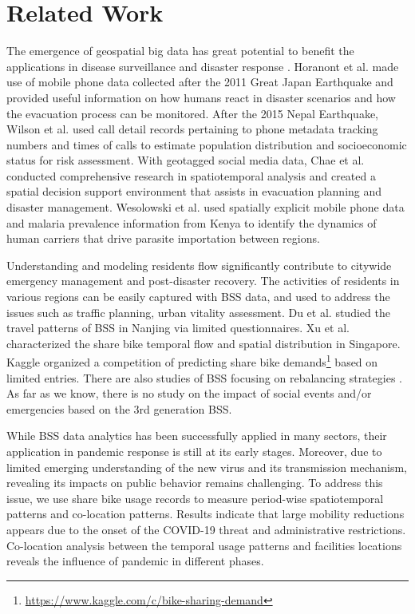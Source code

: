 \documentclass[preprints,ijgi,submit,moreauthors]{Definitions/mdpi}
\begin{document}
\section*{Related Work}
The emergence of geospatial big data has great potential to benefit the applications in disease surveillance and disaster response \cite{Yu2018Big, Goodchild2010Crowdsourcing, Huang2015Predicating}.
Horanont et al. \cite{Horanont2013Auto} made use of mobile phone data collected after the 2011 Great Japan Earthquake and provided useful information on how humans react in disaster scenarios and how the evacuation process can be monitored.
After the 2015 Nepal Earthquake, Wilson et al. \cite{Wilson2016Rapid} used call detail records pertaining to phone metadata tracking numbers and times of calls to estimate population distribution and socioeconomic status for risk assessment.
With geotagged social media data, Chae et al. \cite{CHAE2013Public} conducted comprehensive research in spatiotemporal analysis and created a spatial decision support environment that assists in evacuation planning and disaster management.
Wesolowski et al. \cite{Wesolowski2012Quantifying} used spatially explicit mobile phone data and malaria prevalence information from Kenya to identify the dynamics of human carriers that drive parasite importation between regions.

Understanding and modeling residents flow significantly contribute to citywide emergency management and post-disaster recovery.
The activities of residents in various regions can be easily captured with BSS data, and used to address the issues such as traffic planning, urban vitality assessment.
Du et al. \cite{du2018better} studied the travel patterns of BSS in Nanjing via limited questionnaires.
Xu et al. \cite{xu2019unravel} characterized the share bike temporal flow and spatial distribution in Singapore.
Kaggle organized a competition of predicting share bike demands\footnote{\url{https://www.kaggle.com/c/bike-sharing-demand}} based on limited entries.
There are also studies of BSS focusing on rebalancing strategies \cite{pal2017free, ai2019deep,chen2016dynamic}.
As far as we know, there is no study on the impact of social events and/or emergencies based on the 3rd generation BSS.

While BSS data analytics has been successfully applied in many sectors, their application in pandemic response is still at its early stages.
Moreover, due to limited emerging understanding of the new virus and its transmission mechanism, revealing its impacts on public behavior remains challenging.
To address this issue, we use share bike usage records to measure period-wise spatiotemporal patterns and co-location patterns. 
Results indicate that large mobility reductions appears due to the onset of the COVID-19 threat and administrative restrictions.
Co-location analysis between the temporal usage patterns and facilities locations reveals the influence of pandemic in different phases.
\end{document}
